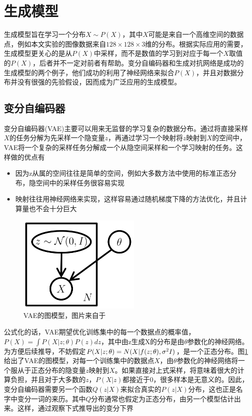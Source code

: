 \documentclass[UTF8,openany,AutoFakeBold,AutoFakeSlant,cs4size]{ctexbook}
\begin{document}
\section{生成模型}

生成模型旨在学习一个分布$X \sim P(X)$，其中$X$可能是来自一个高维空间的数据点，例如本文实验的图像数据来自$128 \times 128 \times 3$维的分布。根据实际应用的需要，生成模型更关心的是从$P(X)$中采样，而不是数值的学习到对应于每一个$X$取值的$P(X)$，后者并不一定对前者有帮助。变分自编码器和生成对抗网络是成功的生成模型的两个例子，他们成功的利用了神经网络来拟合$P(X)$，并且对数据分布并没有很强的先验假设，因而成为广泛应用的生成模型。

\subsection{变分自编码器}

变分自编码器(VAE)\cite{kingma2014autoencoding}主要可以用来无监督的学习复杂的数据分布。通过将直接采样$X$的任务分解为先采样一个隐变量$z$，再通过学习一个映射将$z$映射到$X$的空间中，VAE将一个复杂的采样任务分解成一个从隐空间采样和一个学习映射的任务。这样做的优点有
\begin{itemize}
	\item 因为z从属的空间往往是简单的空间，例如大多数方法中使用的标准正态分布，隐空间中的采样任务很容易实现
	\item 映射往往用神经网络来实现，这样容易通过随机梯度下降的方法优化，并且计算量也不会十分巨大
\end{itemize}

\begin{figure}
\centering
\includegraphics[width=6cm]{./images/vae_model.png}
\caption{VAE的图模型，图片来自于\cite{doersch2016tutorial}}
\label{vae_model}
\end{figure}

公式化的话，VAE期望优化训练集中的每一个数据点的概率值，$P(X) = \int P(X | z; \theta) P(z) dz$，其中由z生成X的分布是由$\theta$参数化的神经网络。为方便后续推导，不妨假定$P(X | z; \theta) = N(X | f(z; \theta), \sigma^2 \* I)$，是一个正态分布。图\ref{vae_model}给出了VAE的图模型，对每一个训练集中的数据点$X$，由$\theta$参数化的神经网络将一个服从于正态分布的隐变量$z$映射到$X$。如果直接对上式采样，将意味着很大的计算负担，并且对于大多数的$z$，$P(X|z)$都接近于$0$，很多样本是无意义的。因此，变分自编码器需要另一个函数$Q(z|X)$来拟合真实的$P(z|X)$分布，这也正是名字中变分一词的来历。其中$Q$分布通常也假定为正态分布，由另一个模型估计出来。这样，通过观察下式推导出的变分下界
\end{document}
